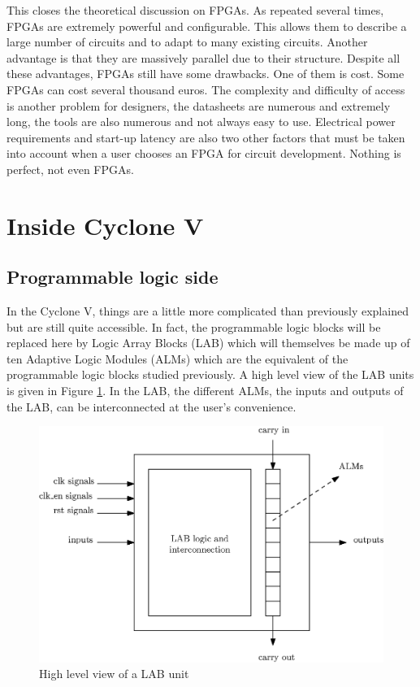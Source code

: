 This closes the theoretical discussion on FPGAs. As repeated several times, FPGAs are extremely 
powerful and configurable. This allows them to describe a large number of circuits and to adapt to
many existing circuits. Another advantage is that they are massively parallel due to their 
structure. Despite all these 
advantages, FPGAs still have some drawbacks. One of them is cost. Some FPGAs can cost several 
thousand euros. The complexity and difficulty of access is another problem for designers, the 
datasheets are numerous and extremely long, the tools are also numerous and not always easy to use. 
Electrical power requirements and start-up latency are also two other factors that must be taken 
into account when a user chooses an FPGA for circuit development. Nothing is perfect, not even 
FPGAs.

\section{Inside Cyclone V}

\subsection{Programmable logic side}

In the Cyclone V, things are a little more complicated than previously explained but are still quite 
accessible. In fact, the programmable logic blocks will be replaced here by Logic Array Blocks (LAB) 
which will themselves be made up of ten Adaptive Logic Modules (ALMs) which are the equivalent of 
the programmable logic blocks studied previously. A high level view of the LAB units is given in
Figure \ref{fig:cyc5/lab}. In the LAB, the different ALMs, the inputs and outputs of the LAB, can be 
interconnected at the user's convenience.

\begin{figure}[H]
    \centering
    \includegraphics[scale=0.8]{Chapter1-Hardware/res/lab_block.eps}
    \caption{High level view of a LAB unit}
    \label{fig:cyc5/lab}
\end{figure}

